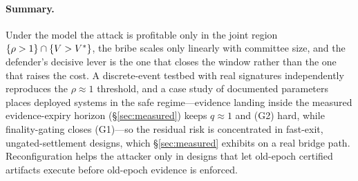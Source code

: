 \paragraph{Summary.}
Under the model the attack is profitable only in the joint region
$\{\rho>1\}\cap\{V>V^{*}\}$, the bribe scales only linearly with committee size, and the
defender's decisive lever is the one that closes the window rather than the one that raises the cost.
A discrete-event testbed with real signatures independently reproduces the $\rho\approx1$ threshold,
and a case study of documented parameters places deployed systems in the safe regime---evidence
landing inside the measured evidence-expiry horizon (\S\ref{sec:measured}) keeps $q\approx1$ and (G2)
hard, while finality-gating closes (G1)---so the residual risk is concentrated in fast-exit,
ungated-settlement designs, which \S\ref{sec:measured} exhibits on a real bridge path.
Reconfiguration helps the attacker only in designs that let
old-epoch certified artifacts execute before old-epoch evidence is enforced.
